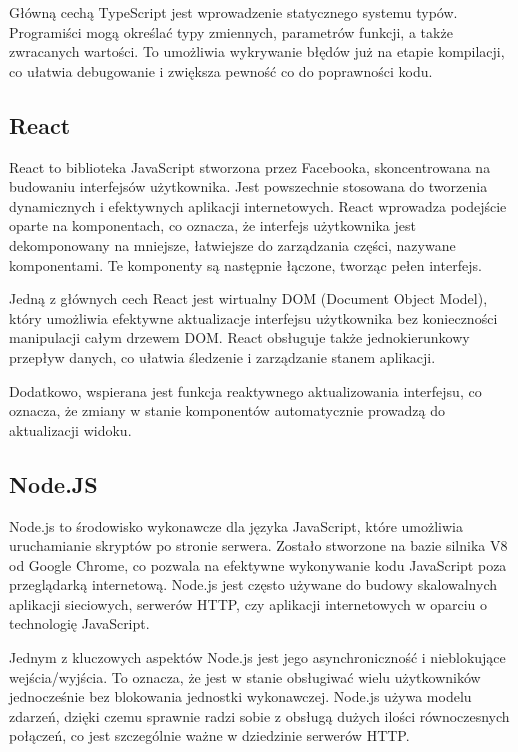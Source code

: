 \documentclass[12pt,twoside]{article}
\begin{document}
Główną cechą TypeScript jest wprowadzenie statycznego systemu typów. Programiści mogą określać typy zmiennych, parametrów funkcji, a także zwracanych wartości. To umożliwia wykrywanie błędów już na etapie kompilacji, co ułatwia debugowanie i zwiększa pewność co do poprawności kodu.

\subsection{React}
React to biblioteka JavaScript stworzona przez Facebooka, skoncentrowana na budowaniu interfejsów użytkownika. Jest powszechnie stosowana do tworzenia dynamicznych i efektywnych aplikacji internetowych. React wprowadza podejście oparte na komponentach, co oznacza, że interfejs użytkownika jest dekomponowany na mniejsze, łatwiejsze do zarządzania części, nazywane komponentami. Te komponenty są następnie łączone, tworząc pełen interfejs.

Jedną z głównych cech React jest wirtualny DOM (Document Object Model), który umożliwia efektywne aktualizacje interfejsu użytkownika bez konieczności manipulacji całym drzewem DOM. React obsługuje także jednokierunkowy przepływ danych, co ułatwia śledzenie i zarządzanie stanem aplikacji.

Dodatkowo, wspierana jest funkcja reaktywnego aktualizowania interfejsu, co oznacza, że zmiany w stanie komponentów automatycznie prowadzą do aktualizacji widoku.

\subsection{Node.JS}

Node.js to środowisko wykonawcze dla języka JavaScript, które umożliwia uruchamianie skryptów po stronie serwera. Zostało stworzone na bazie silnika V8 od Google Chrome, co pozwala na efektywne wykonywanie kodu JavaScript poza przeglądarką internetową. Node.js jest często używane do budowy skalowalnych aplikacji sieciowych, serwerów HTTP, czy aplikacji internetowych w oparciu o technologię JavaScript.

Jednym z kluczowych aspektów Node.js jest jego asynchroniczność i nieblokujące wejścia/wyjścia. To oznacza, że jest w stanie obsługiwać wielu użytkowników jednocześnie bez blokowania jednostki wykonawczej. Node.js używa modelu zdarzeń, dzięki czemu sprawnie radzi sobie z obsługą dużych ilości równoczesnych połączeń, co jest szczególnie ważne w dziedzinie serwerów HTTP.
\newpage
\end{document}
